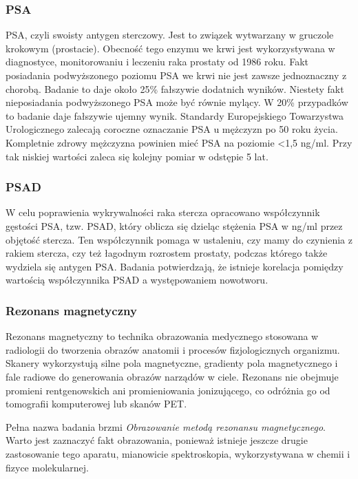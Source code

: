 \documentclass[a4paper,11pt,twoside]{report}
\theoremstyle{definition}
\begin{document}
\subsubsection{PSA}
PSA, czyli swoisty antygen sterczowy. Jest to związek wytwarzany w gruczole krokowym (prostacie). Obecność tego enzymu we krwi jest wykorzystywana w diagnostyce, monitorowaniu i leczeniu raka prostaty od 1986 roku. Fakt posiadania podwyższonego poziomu PSA we krwi nie jest zawsze jednoznaczny z chorobą. Badanie to daje około 25\% fałszywie dodatnich wyników. Niestety fakt nieposiadania podwyższonego PSA może być równie mylący. W 20\% przypadków to badanie daje fałszywie ujemny wynik. Standardy Europejskiego Towarzystwa Urologicznego zalecają coroczne oznaczanie PSA u mężczyzn po 50 roku życia. 
Kompletnie zdrowy mężczyzna powinien mieć PSA na poziomie <1,5 ng/ml. Przy tak niskiej wartości zaleca się kolejny pomiar w odstępie 5 lat. 

\subsubsection{PSAD}
W celu poprawienia wykrywalności raka stercza opracowano współczynnik gęstości PSA, tzw.
PSAD, który oblicza się dzieląc stężenia PSA w ng/ml przez objętość stercza. Ten współczynnik pomaga w ustaleniu, czy mamy do czynienia z rakiem stercza, czy też łagodnym rozrostem prostaty, podczas którego także wydziela się antygen PSA. Badania potwierdzają, że istnieje korelacja pomiędzy wartością współczynnika PSAD a występowaniem nowotworu.

\subsubsection{Rezonans magnetyczny}
Rezonans magnetyczny to technika obrazowania medycznego stosowana w radiologii do tworzenia obrazów anatomii i procesów fizjologicznych organizmu. Skanery wykorzystują silne pola magnetyczne, gradienty pola magnetycznego i fale radiowe do generowania obrazów narządów w ciele. Rezonans nie obejmuje promieni rentgenowskich ani promieniowania jonizującego, co odróżnia go od tomografii komputerowej lub  skanów PET.
\par
Pełna nazwa badania brzmi \textit{Obrazowanie metodą rezonansu magnetycznego}. Warto jest zaznaczyć fakt obrazowania, ponieważ istnieje jeszcze drugie zastosowanie tego aparatu, mianowicie spektroskopia, wykorzystywana w chemii i fizyce molekularnej. 
\end{document}
